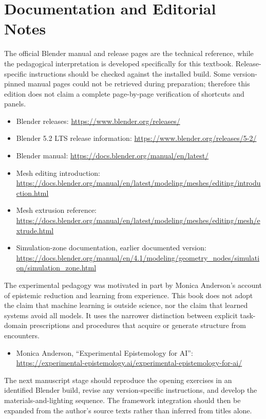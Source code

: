 \documentclass[11pt,openany]{book}
\begin{document}
\chapter*{Documentation and Editorial Notes}

The official Blender manual and release pages are the technical reference, while the pedagogical interpretation is developed specifically for this textbook. Release-specific instructions should be checked against the installed build. Some version-pinned manual pages could not be retrieved during preparation; therefore this edition does not claim a complete page-by-page verification of shortcuts and panels.

\begin{itemize}[leftmargin=1.4em,itemsep=0.35em]
  \item Blender releases: \url{https://www.blender.org/releases/}
  \item Blender 5.2 LTS release information: \url{https://www.blender.org/releases/5-2/}
  \item Blender manual: \url{https://docs.blender.org/manual/en/latest/}
  \item Mesh editing introduction: \url{https://docs.blender.org/manual/en/latest/modeling/meshes/editing/introduction.html}
  \item Mesh extrusion reference: \url{https://docs.blender.org/manual/en/latest/modeling/meshes/editing/mesh/extrude.html}
  \item Simulation-zone documentation, earlier documented version: \url{https://docs.blender.org/manual/en/4.1/modeling/geometry_nodes/simulation/simulation_zone.html}
\end{itemize}

The experimental pedagogy was motivated in part by Monica Anderson's account of epistemic reduction and learning from experience. This book does not adopt the claim that machine learning is outside science, nor the claim that learned systems avoid all models. It uses the narrower distinction between explicit task-domain prescriptions and procedures that acquire or generate structure from encounters.

\begin{itemize}[leftmargin=1.4em]
  \item Monica Anderson, ``Experimental Epistemology for AI'': \url{https://experimental-epistemology.ai/experimental-epistemology-for-ai/}
\end{itemize}

The next manuscript stage should reproduce the opening exercises in an identified Blender build, revise any version-specific instructions, and develop the materials-and-lighting sequence. The framework integration should then be expanded from the author's source texts rather than inferred from titles alone.
\end{document}
